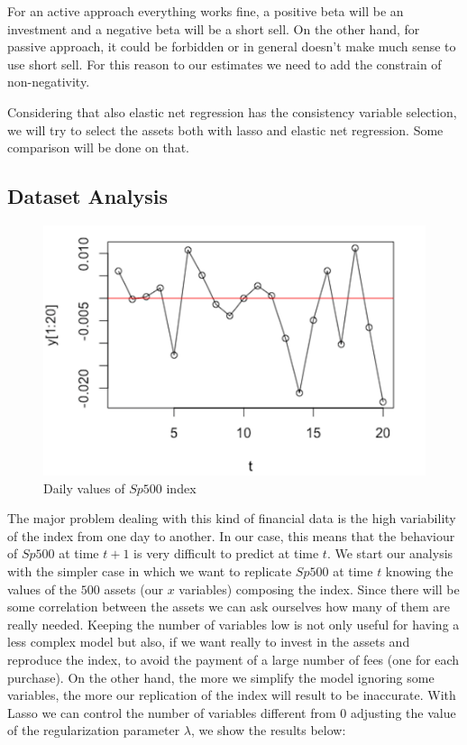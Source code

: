 \documentclass{article}%
\begin{document}
For an active approach everything works fine, a positive beta will be an investment and a negative beta will be a short sell. On the other hand, for passive approach, it could be forbidden or in general doesn't make much sense to use short sell. For this reason to our estimates we need to add the constrain of non-negativity.

Considering that also elastic net regression has the consistency variable selection, we will try to select the assets both with lasso and elastic net regression. Some comparison will be done on that.

\subsection{Dataset Analysis}
\begin{figure}[h!!!]
  \centering
  \includegraphics[scale=0.6]{daily_var.png}
  \caption{Daily values of $Sp500$ index}
  \label{daily_var}
\end{figure}

The major problem dealing with this kind of financial data is the high variability of the index from one day to another. In our case, this means that the behaviour of  $Sp500$ at time $t+1$ is very difficult to predict at time $t$.
We start our analysis with the simpler case in which we want to replicate $Sp500$ at time $t$ knowing the values of the $500$ assets (our $x$ variables) composing the index. Since there will be some correlation between the assets we can ask ourselves how many of them are really needed. Keeping the number of variables low is not only useful for having a less complex model but also, if we want really to invest in the assets and reproduce the index, to avoid the payment of a large number of fees (one for each purchase). On the other hand, the more we simplify the model ignoring some variables, the more our replication of the index will result to be inaccurate. With Lasso we can control the number of variables different from $0$ adjusting the value of the regularization parameter $\lambda$, we show the results below: 
\end{document}
